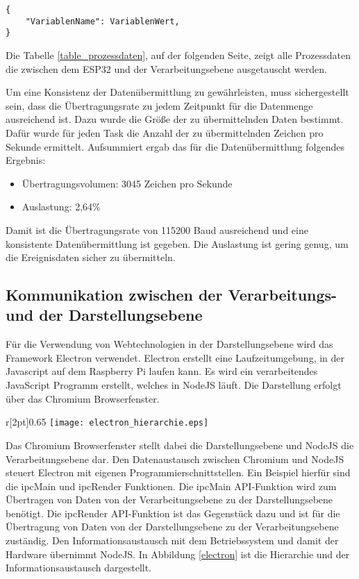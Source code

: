 \begin{Verbatim}[frame=single, fontsize=\small]
{
	"VariablenName": VariablenWert,
}
\end{Verbatim}
\vspace{8pt}
\noindent
Die Tabelle \ref{table_prozessdaten}, auf der folgenden Seite, zeigt alle Prozessdaten die zwischen dem ESP32 und der Verarbeitungsebene ausgetauscht werden.
\newpage


\newpage

\noindent
Um eine Konsistenz der Datenübermittlung zu gewährleisten, muss sichergestellt sein, dass die Übertragungsrate zu jedem Zeitpunkt für die Datenmenge ausreichend ist. Dazu wurde die Größe der zu übermittelnden Daten bestimmt. Dafür wurde für jeden Task die Anzahl der zu übermittelnden Zeichen pro Sekunde ermittelt. Aufsummiert ergab das für die Datenübermittlung folgendes Ergebnis:
\begin{itemize}
\itemsep0em
	\item Übertragungsvolumen: 3045 Zeichen pro Sekunde
	\item Auslastung: 2,64\%
\end{itemize}

\noindent
Damit ist die Übertragungsrate von 115200 Baud ausreichend und eine konsistente Datenübermittlung ist gegeben. Die Auslastung ist gering genug, um die Ereignisdaten sicher zu übermitteln.

\subsection{Kommunikation zwischen der Verarbeitungs- und der Darstellungsebene}
Für die Verwendung von Webtechnologien in der Darstellungsebene wird das Framework Electron verwendet. Electron erstellt eine Laufzeitumgebung, in der Javascript auf dem Raspberry Pi laufen kann. Es wird ein verarbeitendes JavaScript Programm erstellt, welches in NodeJS läuft. Die Darstellung erfolgt über das Chromium Browserfenster.\\
\begin{wrapfigure}{r}[2pt]{0.65\textwidth}
	\centering
	\texttt{[image: electron\_hierarchie.eps]}
	\caption{Electron hierarchische Struktur}
	\label{electron}
\end{wrapfigure}
Das Chromium Browserfenster stellt dabei die Darstellungsebene und NodeJS die Verarbeitungsebene dar. Den Datenaustausch zwischen Chromium und NodeJS steuert Electron mit eigenen Programmierschnittstellen. Ein Beispiel hierfür sind die ipcMain und ipcRender Funktionen. Die ipcMain API-Funktion wird zum Übertragen von Daten von der Verarbeitungsebene zu der Darstellungsebene benötigt. Die ipcRender API-Funktion ist das Gegenstück dazu und ist für die Übertragung von Daten von der Darstellungsebene zu der Verarbeitungsebene zuständig. Den Informationsaustausch mit dem Betriebssystem und damit der Hardware übernimmt NodeJS. In Abbildung \ref{electron} ist die Hierarchie und der Informationsaustausch dargestellt.